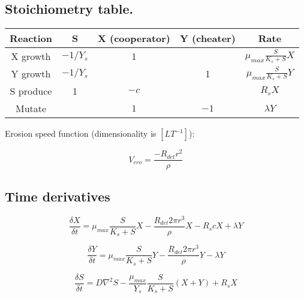 \documentclass[11pt]{amsart}
\begin{document}
		\subsection{Stoichiometry table.}
			\begin{center}
				\renewcommand{\arraystretch}{2}
				\begin{tabular} {c || c | c | c | c}

					Reaction & S & X (cooperator) & Y (cheater) & Rate \\
					\hline
	
					X growth &
						\( -1/Y_s \) & 1 && \(\mu_{max}  \frac {S} {K_s + S} X \) \\
	
					Y growth & 
						\( -1/Y_s \) && 1 & \(\mu_{max} \frac {S} {K_s + S} Y \) \\
		
					S produce & 
						1 & \( -c \) && \( R_sX\)\\
		
					Mutate &&
						\( 1 \) & \( -1 \) & \( \lambda Y\)\\
						
				\end{tabular}
			\end{center}

			Erosion speed function (dimensionality is \([LT^{-1}]\)):

			\begin{equation}
				V_{ero} = \frac{-R_{det}r^2}{\rho} 
			\end{equation}

		\subsection{Time derivatives } %
			\begin{center}
				\begin{equation}
					\frac{ \delta X }{\delta t} = \mu_{max} \frac{S}{K_s + S} X -  \frac{R_{det}2 \pi r^3}{\rho}  X - R_scX + \lambda Y
				\end{equation}
	
				\begin{equation}
					\frac{\delta Y}{\delta t} = \mu_{max} \frac{S}{K_s + S} Y -\frac{R_{det}2 \pi r^3}{\rho}  Y - \lambda Y
				\end{equation}

				\begin{equation}
					\frac{\delta S}{\delta t} = D \nabla ^ 2S - \frac{\mu_{max}}{Y_s}\frac{S}{K_s+S}(X+Y)+R_sX
				\end{equation}

			\end{center}
\end{document}
